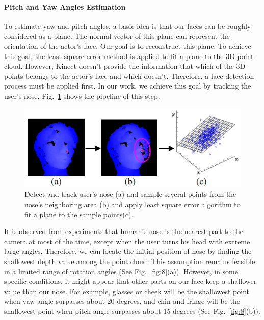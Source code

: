 \paragraph{Pitch and Yaw Angles Estimation}
To estimate yaw and pitch angles, a basic idea is that our faces can be roughly considered as a plane. The normal vector of this plane can represent the orientation of the actor’s face. Our goal is to reconstruct this plane. To achieve this goal, the least square error method is applied to fit a plane to the 3D point cloud. However, Kinect doesn’t provide the information that which of the 3D points belongs to the actor’s face and which doesn’t. Therefore, a face detection process must be applied first. In our work, we achieve this goal by tracking the user’s nose. Fig.~\ref{fig:7} shows the pipeline of this step.

\begin{figure}
\includegraphics[width=1.0\linewidth]{./fig7.png}
\caption{Detect and track user’s nose (a) and sample several points from the nose’s neighboring area (b) and apply least square error algorithm to fit a plane to the sample points(c).}
\label{fig:7}       %
\end{figure}

It is observed from experiments that human’s nose is the nearest part to the camera at most of the time, except when the user turns his head with extreme large angles. Therefore, we can locate the initial position of nose by finding the shallowest depth value among the point cloud. This assumption remains feasible in a limited range of rotation angles (See Fig.~\ref{fig:8}(a)). However, in some specific conditions, it might appear that other parts on our face keep a shallower value than our nose. For example, glasses or cheek will be the shallowest point when yaw angle surpasses about 20 degrees, and chin and fringe will be the shallowest point when pitch angle surpasses about 15 degrees (See Fig.~\ref{fig:8}(b)).

